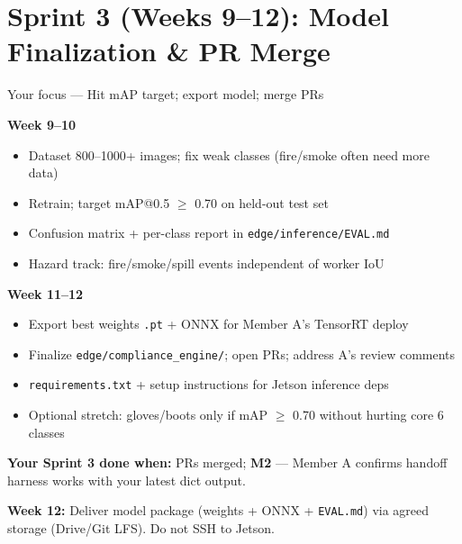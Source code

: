 \documentclass[12pt,a4paper]{article}
\begin{document}
\section{Sprint 3 (Weeks 9--12): Model Finalization \& PR Merge}

\begin{sprintbox}{{Your focus --- Hit mAP target; export model; merge PRs}}

\begin{taskbox}
\textbf{Week 9--10}
\begin{itemize}
    \item Dataset 800--1000+ images; fix weak classes (fire/smoke often need more data)
    \item Retrain; target mAP@0.5 $\geq$ 0.70 on held-out test set
    \item Confusion matrix + per-class report in \texttt{edge/inference/EVAL.md}
    \item Hazard track: fire/smoke/spill events independent of worker IoU
\end{itemize}
\end{taskbox}

\begin{taskbox}
\textbf{Week 11--12}
\begin{itemize}
    \item Export best weights \texttt{.pt} + ONNX for Member A's TensorRT deploy
    \item Finalize \texttt{edge/compliance\_engine/}; open PRs; address A's review comments
    \item \texttt{requirements.txt} + setup instructions for Jetson inference deps
    \item Optional stretch: gloves/boots only if mAP $\geq$ 0.70 without hurting core 6 classes
\end{itemize}
\end{taskbox}

\begin{deliverablebox}
\textbf{Your Sprint 3 done when:} PRs merged; \textbf{M2} --- Member A confirms handoff harness works with your latest dict output.
\end{deliverablebox}

\begin{collabbox}
\textbf{Week 12:} Deliver model package (weights + ONNX + \texttt{EVAL.md}) via agreed storage (Drive/Git LFS). Do not SSH to Jetson.
\end{collabbox}

\end{sprintbox}
\end{document}

